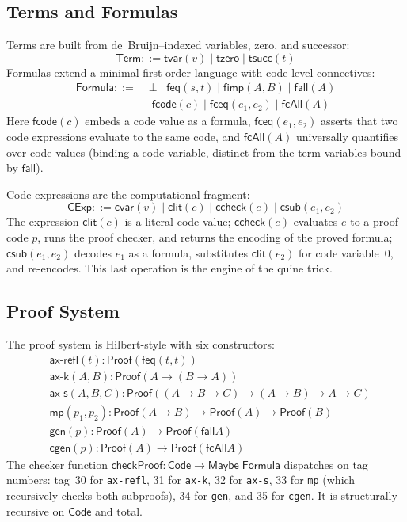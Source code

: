 \documentclass[11pt]{article}
\newcommand{\Code}{\mathsf{Code}}
\newcommand{\CExp}{\mathsf{CExp}}
\newcommand{\Formula}{\mathsf{Formula}}
\newcommand{\Term}{\mathsf{Term}}
\newcommand{\Proof}{\mathsf{Proof}}
\newcommand{\checkProof}{\mathsf{checkProof}}
\newcommand{\csub}{\mathsf{csub}}
\newcommand{\clit}{\mathsf{clit}}
\newcommand{\ccheck}{\mathsf{ccheck}}
\newcommand{\cvar}{\mathsf{cvar}}
\newcommand{\fbot}{\bot}
\newcommand{\feq}{\mathsf{feq}}
\newcommand{\fimp}{\mathsf{fimp}}
\newcommand{\fall}{\mathsf{fall}}
\newcommand{\fcode}{\mathsf{fcode}}
\newcommand{\fceq}{\mathsf{fceq}}
\newcommand{\fcAll}{\mathsf{fcAll}}
\begin{document}
\subsection{Terms and Formulas}

Terms are built from de~Bruijn--indexed variables, zero, and successor:
\[
  \Term ::= \mathsf{tvar}(v) \mid \mathsf{tzero} \mid \mathsf{tsucc}(t)
\]
Formulas extend a minimal first-order language with code-level connectives:
\begin{align*}
  \Formula ::=\;
  & \fbot
    \mid \feq(s, t)
    \mid \fimp(A, B)
    \mid \fall(A) \\
  &\mid \fcode(c)
    \mid \fceq(e_1, e_2)
    \mid \fcAll(A)
\end{align*}
Here $\fcode(c)$ embeds a code value as a formula, $\fceq(e_1, e_2)$
asserts that two code expressions evaluate to the same code, and
$\fcAll(A)$ universally quantifies over code values (binding a code
variable, distinct from the term variables bound by $\fall$).

Code expressions are the computational fragment:
\[
  \CExp ::= \cvar(v) \mid \clit(c) \mid \ccheck(e) \mid \csub(e_1, e_2)
\]
The expression $\clit(c)$ is a literal code value; $\ccheck(e)$ evaluates
$e$ to a proof code $p$, runs the proof checker, and returns the encoding
of the proved formula; $\csub(e_1, e_2)$ decodes $e_1$ as a formula,
substitutes $\clit(e_2)$ for code variable~0, and re-encodes. This last
operation is the engine of the quine trick.

\subsection{Proof System}

The proof system is Hilbert-style with six constructors:
\begin{align*}
  &\mathsf{ax\text{-}refl}(t) : \Proof(\feq(t, t)) \\
  &\mathsf{ax\text{-}k}(A, B) : \Proof(A \to (B \to A)) \\
  &\mathsf{ax\text{-}s}(A, B, C) : \Proof((A \to B \to C) \to (A \to B) \to A \to C) \\
  &\mathsf{mp}(p_1, p_2) : \Proof(A \to B) \to \Proof(A) \to \Proof(B) \\
  &\mathsf{gen}(p) : \Proof(A) \to \Proof(\fall A) \\
  &\mathsf{cgen}(p) : \Proof(A) \to \Proof(\fcAll A)
\end{align*}
The checker function $\checkProof : \Code \to \mathsf{Maybe}\;\Formula$
dispatches on tag numbers: tag~30 for \texttt{ax-refl}, 31 for
\texttt{ax-k}, 32 for \texttt{ax-s}, 33 for \texttt{mp} (which
recursively checks both subproofs), 34 for \texttt{gen}, and 35 for
\texttt{cgen}. It is structurally recursive on $\Code$ and total.
\end{document}
